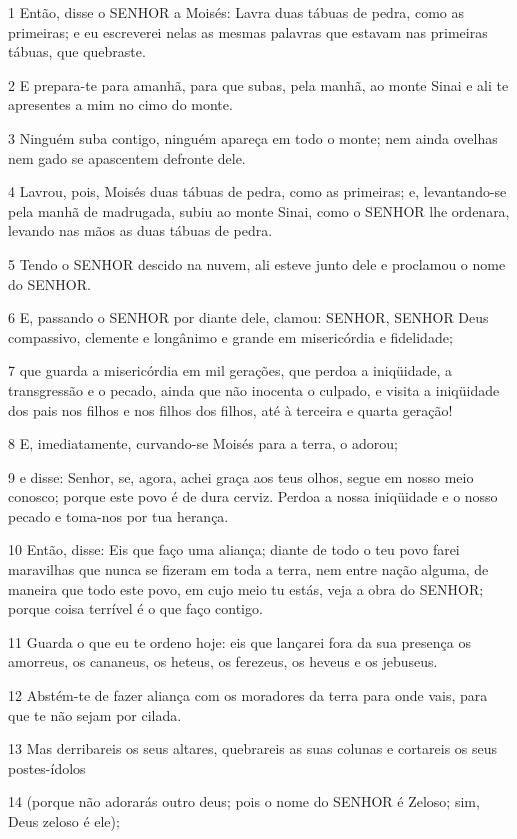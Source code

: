 \par 1 Então, disse o SENHOR a Moisés: Lavra duas tábuas de pedra, como as primeiras; e eu escreverei nelas as mesmas palavras que estavam nas primeiras tábuas, que quebraste.
\par 2 E prepara-te para amanhã, para que subas, pela manhã, ao monte Sinai e ali te apresentes a mim no cimo do monte.
\par 3 Ninguém suba contigo, ninguém apareça em todo o monte; nem ainda ovelhas nem gado se apascentem defronte dele.
\par 4 Lavrou, pois, Moisés duas tábuas de pedra, como as primeiras; e, levantando-se pela manhã de madrugada, subiu ao monte Sinai, como o SENHOR lhe ordenara, levando nas mãos as duas tábuas de pedra.
\par 5 Tendo o SENHOR descido na nuvem, ali esteve junto dele e proclamou o nome do SENHOR.
\par 6 E, passando o SENHOR por diante dele, clamou: SENHOR, SENHOR Deus compassivo, clemente e longânimo e grande em misericórdia e fidelidade;
\par 7 que guarda a misericórdia em mil gerações, que perdoa a iniqüidade, a transgressão e o pecado, ainda que não inocenta o culpado, e visita a iniqüidade dos pais nos filhos e nos filhos dos filhos, até à terceira e quarta geração!
\par 8 E, imediatamente, curvando-se Moisés para a terra, o adorou;
\par 9 e disse: Senhor, se, agora, achei graça aos teus olhos, segue em nosso meio conosco; porque este povo é de dura cerviz. Perdoa a nossa iniqüidade e o nosso pecado e toma-nos por tua herança.
\par 10 Então, disse: Eis que faço uma aliança; diante de todo o teu povo farei maravilhas que nunca se fizeram em toda a terra, nem entre nação alguma, de maneira que todo este povo, em cujo meio tu estás, veja a obra do SENHOR; porque coisa terrível é o que faço contigo.
\par 11 Guarda o que eu te ordeno hoje: eis que lançarei fora da sua presença os amorreus, os cananeus, os heteus, os ferezeus, os heveus e os jebuseus.
\par 12 Abstém-te de fazer aliança com os moradores da terra para onde vais, para que te não sejam por cilada.
\par 13 Mas derribareis os seus altares, quebrareis as suas colunas e cortareis os seus postes-ídolos
\par 14 (porque não adorarás outro deus; pois o nome do SENHOR é Zeloso; sim, Deus zeloso é ele);
